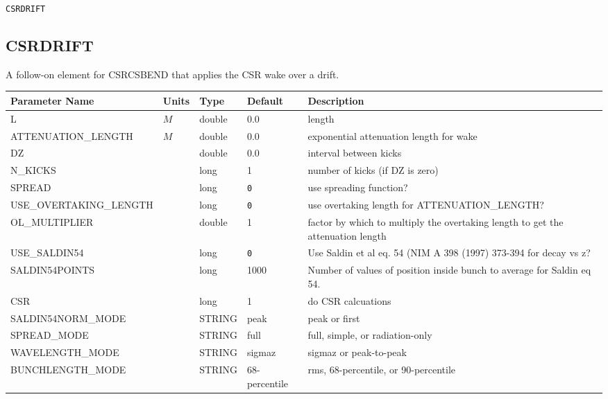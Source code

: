 \vspace*{0.5in}

\begin{latexonly}
\newpage
\begin{center}{\Large\verb|CSRDRIFT|}\end{center}
\end{latexonly}\subsection{CSRDRIFT}
A follow-on element for CSRCSBEND that applies the CSR wake over a drift.
\\
\begin{tabular}{|l|l|l|l|p{\descwidth}|} \hline
Parameter Name & Units & Type & Default & Description \\ \hline 
L & $M$ & double &  0.0 & length  \\ \hline 
ATTENUATION\_LENGTH & $M$ & double &  0.0 & exponential attenuation length for wake  \\ \hline 
DZ &  & double &  0.0 & interval between kicks  \\ \hline 
N\_KICKS &  & long &   1               & number of kicks (if DZ is zero)  \\ \hline 
SPREAD &  & long &  \verb|0| & use spreading function?  \\ \hline 
USE\_OVERTAKING\_LENGTH &  & long &  \verb|0| & use overtaking length for ATTENUATION\_LENGTH?  \\ \hline 
OL\_MULTIPLIER &  & double &   1 & factor by which to multiply the overtaking length to get the attenuation length  \\ \hline 
USE\_SALDIN54 &  & long &  \verb|0| & Use Saldin et al eq. 54 (NIM A 398 (1997) 373-394 for decay vs z?  \\ \hline 
SALDIN54POINTS &  & long &   1000            & Number of values of position inside bunch to average for Saldin eq 54.  \\ \hline 
CSR &  & long &   1               & do CSR calcuations  \\ \hline 
SALDIN54NORM\_MODE &  & STRING &   peak            & peak or first  \\ \hline 
SPREAD\_MODE &  & STRING &   full            & full, simple, or radiation-only  \\ \hline 
WAVELENGTH\_MODE &  & STRING &   sigmaz          & sigmaz or peak-to-peak  \\ \hline 
BUNCHLENGTH\_MODE &  & STRING &   68-percentile   & rms, 68-percentile, or 90-percentile  \\ \hline 

\end{tabular}

